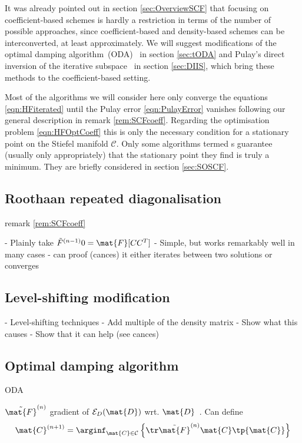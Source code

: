 \pagebreak
It was already pointed out in section \vref{sec:OverviewSCF}
that focusing on coefficient-based schemes
is hardly a restriction in terms of the number of possible approaches,
since coefficient-based and density-based schemes can be interconverted,
at least approximately.
We will suggest modifications of the
optimal damping algorithm~(ODA)~\cite{Cances2000a} in section \ref{sec:tODA}
and Pulay's direct inversion of the iterative subspace~\cite{Pulay1982}
in section \ref{sec:DIIS},
which bring these methods to the coefficient-based setting.

Most of the \SCF algorithms we will consider here
only converge the \HF equations \eqref{eqn:HFiterated}
until the Pulay error \eqref{eqn:PulayError} vanishes
following our general description in remark \vref{rem:SCFcoeff}.
Regarding the \HF optimisation problem \eqref{eqn:HFOptCoeff}
this is only the necessary condition for a stationary point on the Stiefel
manifold $\mathcal{C}$.
Only some \SCF algorithms
termed s
guarantee (usually only appropriately)
that the stationary point they find is truly a minimum.
They are briefly considered in section \ref{sec:SOSCF}.

\subsection{Roothaan repeated diagonalisation}
\label{sec:RoothaanRepeatedDiag}

remark \vref{rem:SCFcoeff}



- Plainly take $\tilde{F}^{(n-1)}0= \mat{F}[CC^T]$
- Simple, but works remarkably well in many cases
- can proof (cances) it either iterates between two solutions or converges

\subsection{Level-shifting modification}
- Level-shifting techniques \cite{Mehrotra1977}
- Add multiple of the density matrix
- Show what this causes
- Show that it can help (see cances)

\subsection{Optimal damping algorithm}
\label{sec:ODA}
ODA~\cite{Cances2000,Cances2000a}

$\tilde{\mat{F}}^{(n)}$ gradient of $\mathcal{E}_D(\mat{D})$
wrt. $\mat{D}$~\cite{Lions1988,Cances2000}.
Can define~\cite{Lions1988,Cances2000}
\[
	\mat{C}^{(n+1)} = \arginf_{\mat{C} \in \mathcal{C}}
\left\{ \tr \tilde{\mat{F}}^{(n)} \mat{C} \tp{\mat{C}} \right\} \]

